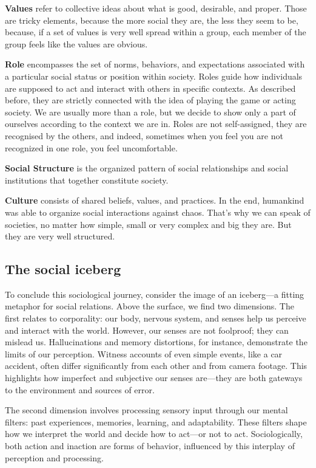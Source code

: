 \textbf{Values} refer to collective ideas about what is good,
desirable, and proper. Those are tricky elements, because the more
social they are, the less they seem to be, because, if a set of values
is very well spread within a group, each member of the group feels
like the values are obvious.

\textbf{Role} encompasses the set of norms, behaviors, and
expectations associated with a particular social status or position
within society. Roles guide how individuals are supposed to act and
interact with others in specific contexts. As described before, they
are strictly connected with the idea of playing the game or acting
society. We are usually more than a role, but we decide to show only 
a part of ourselves according to the context we are in. Roles are not
self-assigned, they are recognised by the others, and indeed,
sometimes when you feel you are not recognized in one role, you feel
uncomfortable.

\textbf{Social Structure} is the organized pattern of social
relationships and social institutions that together constitute
society.

\textbf{Culture} consists of shared beliefs, values, and practices. In
the end, humankind was able to organize social interactions against
chaos. That's why we can speak of societies, no matter how simple,
small or very complex and big they are. But they are very well
structured.

\subsection{The social iceberg}
To conclude this sociological journey, consider the image of an
iceberg—a fitting metaphor for social relations. Above the surface, we
find two dimensions. The first relates to corporality: our body,
nervous system, and senses help us perceive and interact with the
world. However, our senses are not foolproof; they can mislead us.
Hallucinations and memory distortions, for instance, demonstrate the
limits of our perception. Witness accounts of even simple events, like
a car accident, often differ significantly from each other and from
camera footage. This highlights how imperfect and subjective our
senses are—they are both gateways to the environment and sources of
error.

The second dimension involves processing sensory input through our
mental filters: past experiences, memories, learning, and
adaptability. These filters shape how we interpret the world and
decide how to act—or not to act. Sociologically, both action and
inaction are forms of behavior, influenced by this interplay of
perception and processing.

